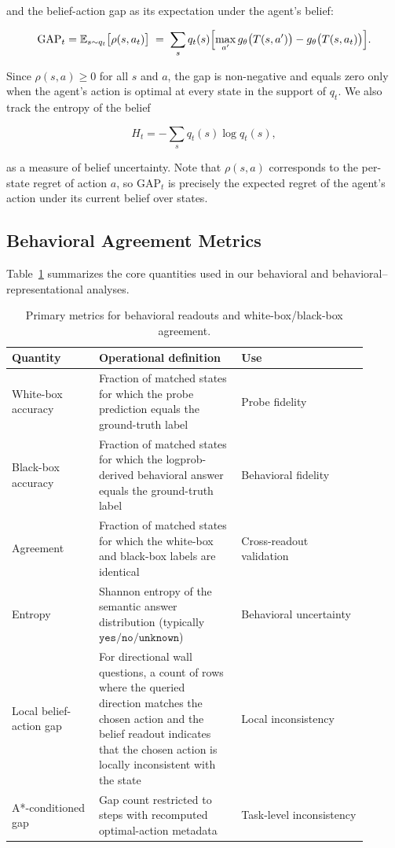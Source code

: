 \documentclass[final]{sparreport}
\begin{document}
and the belief-action gap as its expectation under the agent's belief:

\begin{equation}
    \text{GAP}_t = \mathbb{E}_{s \sim q_t}\bigl[\rho(s, a_t)\bigr]
    \;=\;
    \sum_{s} q_t(s)\Bigl[\max_{a'} g_\theta\bigl(T(s, a')\bigr) - g_\theta\bigl(T(s, a_t)\bigr)\Bigr].
\end{equation}

Since $\rho(s, a) \geq 0$ for all $s$ and $a$, the gap is non-negative and equals
zero only when the agent's action is optimal at every state in the support of $q_t$.
We also track the entropy of the belief

\begin{equation}
    H_t = -\sum_{s} q_t(s) \log q_t(s),
\end{equation}

as a measure of belief uncertainty. Note that $\rho(s, a)$ corresponds to the
per-state regret of action $a$, so $\text{GAP}_t$ is precisely the expected regret
of the agent's action under its current belief over states.

\subsection{Behavioral Agreement Metrics}
Table~\ref{tab:behavioral_metrics} summarizes the core quantities used in our behavioral and behavioral--representational analyses.

\begin{table}[t]
\centering
\small
\caption{Primary metrics for behavioral readouts and white-box/black-box agreement.}
\label{tab:behavioral_metrics}
\begin{tabular}{p{0.22\linewidth}p{0.36\linewidth}p{0.32\linewidth}}
\toprule
\textbf{Quantity} & \textbf{Operational definition} & \textbf{Use} \\
\midrule
White-box accuracy & Fraction of matched states for which the probe prediction equals the ground-truth label & Probe fidelity \\
Black-box accuracy & Fraction of matched states for which the logprob-derived behavioral answer equals the ground-truth label & Behavioral fidelity \\
Agreement & Fraction of matched states for which the white-box and black-box labels are identical & Cross-readout validation \\
Entropy & Shannon entropy of the semantic answer distribution (typically $\texttt{yes}/\texttt{no}/\texttt{unknown}$) & Behavioral uncertainty \\
Local belief-action gap & For directional wall questions, a count of rows where the queried direction matches the chosen action and the belief readout indicates that the chosen action is locally inconsistent with the state & Local inconsistency \\
A*-conditioned gap & Gap count restricted to steps with recomputed optimal-action metadata & Task-level inconsistency \\
\bottomrule
\end{tabular}
\end{table}
\end{document}
